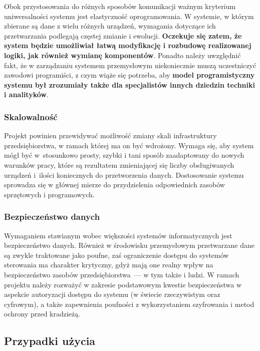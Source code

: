 \documentclass[a4paper, 12pt, twoside]{article}
\begin{document}
Obok przystosowania do różnych sposobów komunikacji ważnym kryterium uniwersalności
systemu jest elastyczność oprogramowania.
W systemie, w którym zbierane są dane z wielu różnych urządzeń, wymagania dotyczące
ich przetwarzania podlegają częstej zmianie i ewolucji. \textbf{Oczekuje się zatem,
      że system będzie umożliwiał łatwą modyfikację i rozbudowę realizowanej logiki, jak
      również wymianę komponentów}. Ponadto należy uwzględnić fakt, że w zarządzaniu
systemem przemysłowym niekoniecznie muszą uczestniczyć zawodowi programiści,
z czym wiąże się potrzeba, aby \textbf{model programistyczny systemu był zrozumiały
      także dla specjalistów innych dziedzin techniki i analityków}.

\subsubsection{Skalowalność}

Projekt powinien przewidywać możliwość zmiany skali infrastruktury przedsiębiorstwa,
w ramach której ma on być wdrożony. Wymaga się, aby system mógł być
w~stosunkowo prosty, szybki i tani sposób zaadaptowany do nowych warunków pracy,
które są rezultatem zmieniającej się liczby obsługiwanych
urządzeń i~ilości koniecznych do przetworzenia danych. Dostosowanie systemu sprowadza
się w głównej mierze do przydzielenia odpowiednich zasobów sprzętowych i programowych.

\subsubsection{Bezpieczeństwo danych}

Wymaganiem stawianym wobec większości systemów informatycznych jest bezpieczeństwo
danych. Również w środowisku przemysłowym przetwarzane dane są zwykle traktowane
jako poufne, zaś ograniczenie dostępu do systemów sterowania ma charakter krytyczny,
gdyż mają one realny wpływ na bezpieczeństwo zasobów przedsiębiorstwa~--- w tym także
i ludzi. W ramach projektu należy rozważyć w zakresie podstawowym kwestie
bezpieczeństwa w aspekcie autoryzacji dostępu do systemu (w świecie rzeczywistym oraz
cyfrowym), a także zapewnienia poufności z wykorzystaniem szyfrowania i
metod ochrony przed kradzieżą.

\subsection{Przypadki użycia}\label{use-case}
\end{document}
